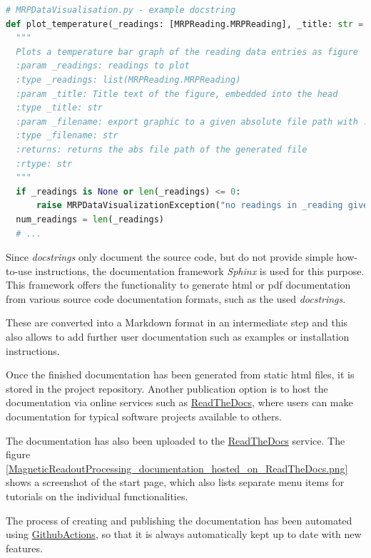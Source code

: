 \newpage

\begin{lstlisting}[language=Python, caption={Documentation using Python docstring example}, label=lst:pydocstring]
# MRPDataVisualisation.py - example docstring
def plot_temperature(_readings: [MRPReading.MRPReading], _title: str = '', _filename: str = None, _unit: str = "degree C") -> str:
  """
  Plots a temperature bar graph of the reading data entries as figure
  :param _readings: readings to plot
  :type _readings: list(MRPReading.MRPReading)
  :param _title: Title text of the figure, embedded into the head
  :type _title: str
  :param _filename: export graphic to a given absolute file path with .png
  :type _filename: str
  :returns: returns the abs file path of the generated file
  :rtype: str
  """
  if _readings is None or len(_readings) <= 0:
      raise MRPDataVisualizationException("no readings in _reading given")
  num_readings = len(_readings)
  # ...
\end{lstlisting}

Since \emph{docstrings} only document the source code, but do not
provide simple how-to-use instructions, the documentation framework
\emph{Sphinx}  is used for this purpose. This framework
offers the functionality to generate \gls{html} or \gls{pdf}
documentation from various source code documentation formats, such as
the used \emph{docstrings}.

These are converted into a Markdown format in an intermediate step and
this also allows to add further user documentation such as examples or
installation instructions.

Once the finished documentation has been generated from static
\gls{html} files, it is stored in the project repository. Another
publication option is to host the documentation via online services such
as \href{https://readthedocs.com}{ReadTheDocs}, where users can make
documentation for typical software projects available to others.

The documentation has also been uploaded to the
\href{https://magneticreadoutprocessing.readthedocs.io/}{ReadTheDocs}
service. The figure
\ref{MagneticReadoutProcessing_documentation_hosted_on_ReadTheDocs.png}
shows a screenshot of the start page, which also lists separate menu
items for tutorials on the individual functionalities.

The process of creating and publishing the documentation has been
automated using
\href{https://github.com/features/actions}{GithubActions}, so that it is
always automatically kept up to date with new features.


